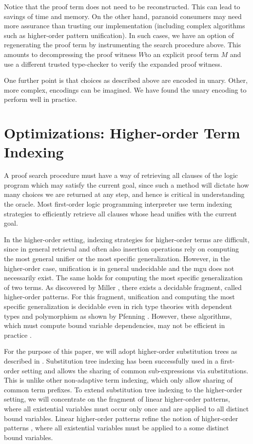 \documentclass{acmconf}
\begin{document}
Notice that the proof term does not need to be reconstructed. This can
lead to savings of time and memory. On the other hand, paranoid
consumers may need more assurance than trusting our implementation
(including complex algorithms such as higher-order pattern
unification). In such cases, we have an option of regenerating the
proof term by instrumenting the search procedure above.  This amounts
to decompressing the proof witness $W$to an explicit proof term $M$
and use a different trusted type-checker to verify the expanded proof
witness.

One further point is that choices as described above are encoded in
unary. Other, more complex, encodings can be imagined. We have found
the unary encoding to perform well in practice. 

\section{Optimizations: Higher-order Term Indexing}

A proof search procedure must have a way of retrieving all clauses of
the logic program which may satisfy the current goal, since such a
method will dictate how many choices we are returned at any step, and
hence is critical in understanding the oracle. Most first-order logic
programming interpreter use term indexing strategies to efficiently
retrieve all clauses whose head unifies with the current goal.

In the higher-order setting, indexing strategies for higher-order
terms are difficult, since in general retrieval and often also
insertion operations rely on computing the most general unifier or the
most specific generalization. However, in the higher-order case,
unification is in general undecidable and the mgu does not necessarily
exist. The same holds for computing the most specific generalization
of two terms. As discovered by Miller \cite{Miller91iclp}, there exists a decidable
fragment, called higher-order patterns. For this fragment, unification
and computing the most specific generalization is decidable even in
rich type theories with dependent types and polymorphism as shown by
Pfenning \cite{Pfenning91lics}.  However, these algorithms, which must
compute bound variable dependencies, may not be efficient in practice
\cite{PientkaPfenning:CADE03}.  

For the purpose of this paper, we will adopt higher-order substitution
trees as described in \cite{Pientka:ICLP03}. Substitution tree
indexing has been successfully used in a first-order setting \cite{Graf+Book95} and
allows the sharing of common sub-expressions via substitutions. This
is unlike other non-adaptive term indexing, which only allow sharing
of common term prefixes. To extend substitution tree indexing to the
higher-order setting, we will concentrate on the fragment of linear
higher-order patterns, where all existential variables must occur only
once and are applied to all distinct bound variables. Linear
higher-order patterns refine the notion of higher-order patterns
\cite{Miller91iclp}, where all existential variables must be applied
to a some distinct bound variables. 
\end{document}
